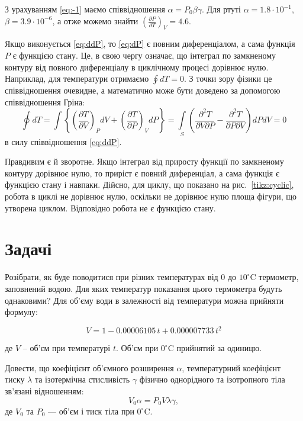 З урахуванням \eqref{eq:-1} маємо співвідношення $\alpha = P_0\beta\gamma$. Для ртуті $\alpha  =
	1.8\cdot 10^{-1}$, $\beta = 3.9\cdot 10^{-6}$, а отже можемо знайти $\left(\frac{\partial P}{\partial
		T} \right)_V = 4.6$.

Якщо виконується \eqref{eq:ddP}, то \eqref{eq:dP} є повним диференціалом, а сама функція $P$ є
функцією стану. Це, в свою чергу означає, що інтеграл по замкненому контуру від повного
диференціалу в
циклічному процесі дорівнює нулю. Наприклад, для температури отримаємо $\oint dT = 0$. З точки зору
фізики це співвідношення очевидне, а математично може бути доведено за допомогою співвідношення Гріна:
\begin{equation*}
	\oint dT = \int\left\{\left(\frac{\partial T}{\partial V}\right)_P dV +  \left(\frac{\partial
		T}{\partial P}\right)_V dP\right\} = \int\limits_S \left(\frac{\partial^2 T}{\partial V \partial P} -
	\frac{\partial^2 T}{\partial P \partial V}\right) dPdV = 0
\end{equation*}
в силу співвідношення \eqref{eq:ddP}.

Правдивим є й зворотне. Якщо інтеграл від приросту функції по замкненому контуру дорівнює нулю, то
приріст є повний диференціал, а сама функція є функцією стану і навпаки. Дійсно, для циклу, що
показано на рис.~\ref{tikz:cyclic}, робота в циклі не дорівнює нулю, оскільки не дорівнює нулю площа
фігури, що утворена циклом. Відповідно робота не є функцією стану.


\section*{Задачі}

\begin{problem}%
Розібрати, як буде поводитися при різних температурах від $0$ до $10^\circ$C термометр, заповнений
водою. Для яких температур показання цього термометра будуть однаковими? Для об'єму води в залежності
від температури можна прийняти формулу:

\[
V = 1 - 0.00006105\,t + 0.000007733\,t^2
\]

де $V$ -- об'єм при температурі $t$. Об'єм при $0^\circ$C прийнятий за одиницю.
\end{problem}


\begin{problem}%
Довести, що коефіцієнт об'ємного розширення $\alpha$, температурний коефіцієнт тиску $\lambda$ та
ізотермічна стисливість $\gamma$ фізично однорідного та ізотропного тіла зв'язані відношенням:
\[
V_0\alpha = P_0 V \lambda \gamma,
\]
де $V_0$ та $P_0$ --- об'єм і тиск тіла при $0^\circ$C.
\end{problem}



